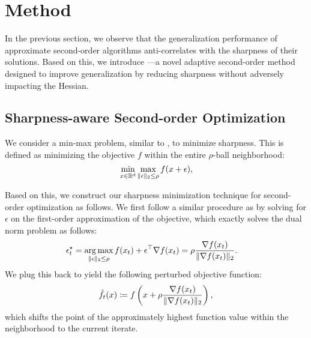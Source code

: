 \section{Method}

In the previous section, we observe that the generalization performance of approximate second-order algorithms anti-correlates with the sharpness of their solutions.
Based on this, we introduce \sassha---a novel adaptive second-order method designed to improve generalization by reducing sharpness without adversely impacting the Hessian.


\subsection{Sharpness-aware Second-order Optimization}\label{sec:psol}

We consider a min-max problem, similar to \citet{keskar2016large, sam}, to minimize sharpness. 
This is defined as minimizing the objective $f$ within the entire $\rho$-ball neighborhood:
\begin{equation} \label{eq:sam_optimization}
    \min_{x\in \mathbb{R}^d} \max_{\|\epsilon\|_2\leq \rho} f(x+\epsilon),
\end{equation}

Based on this, we construct our sharpness minimization technique for second-order optimization as follows.
We first follow a similar procedure as \citet{sam} by solving for $\epsilon$ on the first-order approximation of the objective, which exactly solves the dual norm problem as follows:
\begin{align}
    \epsilon_t^\star = \mathop{\rm arg\,max}_{\|\epsilon\|_2\leq \rho} f(x_t) + \epsilon^\top\nabla f(x_t) 
    &= \rho\frac{\nabla f(x_t)}{\|\nabla f(x_t)\|_2}.
\end{align}
We plug this back to yield the following perturbed objective function:
\begin{equation*}
    \Tilde{f}_{t}(x) \coloneqq f\left(x+\rho\frac{\nabla f(x_t)}{\|\nabla f(x_t)\|_2}\right),
\end{equation*}
which shifts the point of the approximately highest function value within the neighborhood to the current iterate.

